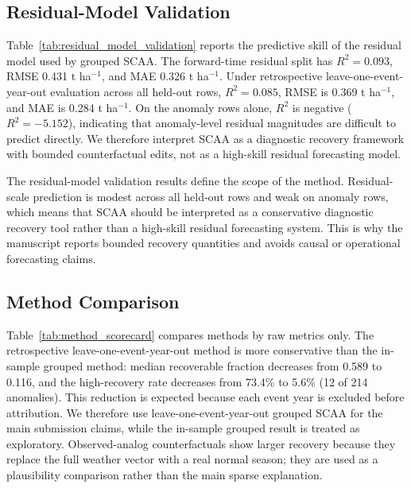 \documentclass[11pt]{article}
\begin{document}
\subsection{Residual-Model Validation}
Table~\ref{tab:residual_model_validation} reports the predictive skill of the
residual model used by grouped SCAA. The forward-time residual split has $R^2=0.093$,
RMSE 0.431 t ha$^{-1}$, and MAE 0.326 t ha$^{-1}$. Under retrospective
leave-one-event-year-out evaluation across all held-out rows, $R^2=0.085$, RMSE is
0.369 t ha$^{-1}$, and MAE is 0.284 t ha$^{-1}$. On the anomaly rows alone, $R^2$ is
negative ($R^2=-5.152$), indicating that anomaly-level residual magnitudes are
difficult to predict directly. We therefore interpret SCAA as a diagnostic recovery
framework with bounded counterfactual edits, not as a high-skill residual forecasting
model.



The residual-model validation results define the scope of the method. Residual-scale
prediction is modest across all held-out rows and weak on anomaly rows, which means
that SCAA should be interpreted as a conservative diagnostic recovery tool rather
than a high-skill residual forecasting system. This is why the manuscript reports
bounded recovery quantities and avoids causal or operational forecasting claims.

\subsection{Method Comparison}
Table~\ref{tab:method_scorecard} compares methods by raw metrics only. The
retrospective leave-one-event-year-out method is more conservative than the in-sample
grouped method: median recoverable fraction decreases from 0.589 to 0.116, and the
high-recovery rate decreases from 73.4\% to 5.6\% (12 of 214 anomalies). This
reduction is expected because each event year is excluded before attribution. We
therefore use leave-one-event-year-out grouped SCAA for the main submission claims,
while the in-sample grouped result is treated as exploratory. Observed-analog
counterfactuals show larger recovery because they replace the full weather vector
with a real normal season; they are used as a plausibility comparison rather than the
main sparse explanation.


\end{document}
